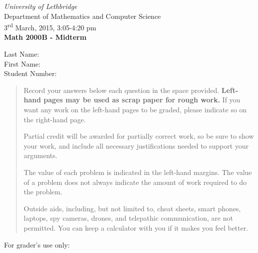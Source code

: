 \documentclass[12pt]{article}
\newcommand{\skipline}{\vspace{12pt}}
\begin{document}
\author{Instructor: Sean Fitzpatrick}
\thispagestyle{plain}
\begin{center}
\emph{University of Lethbridge}\\
Department of Mathematics and Computer Science\\
3\textsuperscript{rd} March, 2015, 3:05-4:20 pm\\
{\bf Math 2000B - Midterm}\\
\end{center}
\skipline \skipline \skipline \noindent \skipline
Last Name:\underline{\hspace{50pt}{\bf SOLUTIONS}\hspace{50pt}}\\
\skipline
First Name:\underline{\hspace{50pt}{\bf THE}\hspace{100pt}}\\
\skipline
Student Number:\underline{\hspace{322pt}}\\


\vspace{0.5in}


\begin{quote}
 Record your answers below each question in the space provided.    {\bf Left-hand pages may be used as scrap paper for rough work.}  If you want any work on the left-hand pages to be graded, please indicate so on the right-hand page.
 
 \bigskip
 
Partial credit will be awarded for partially correct work, so be sure to show your work, and include all necessary justifications needed to support your arguments. 

The value of each problem is indicated in the left-hand margins. The value of a problem does not always indicate the amount of work required to do the problem.

Outside aids, including, but not limited to, cheat sheets, smart phones, laptops, spy cameras, drones, and telepathic communication, are not permitted. You can keep a calculator with you if it makes you feel better.
\end{quote}


\vspace{0.5in}

For grader's use only:
\end{document}
